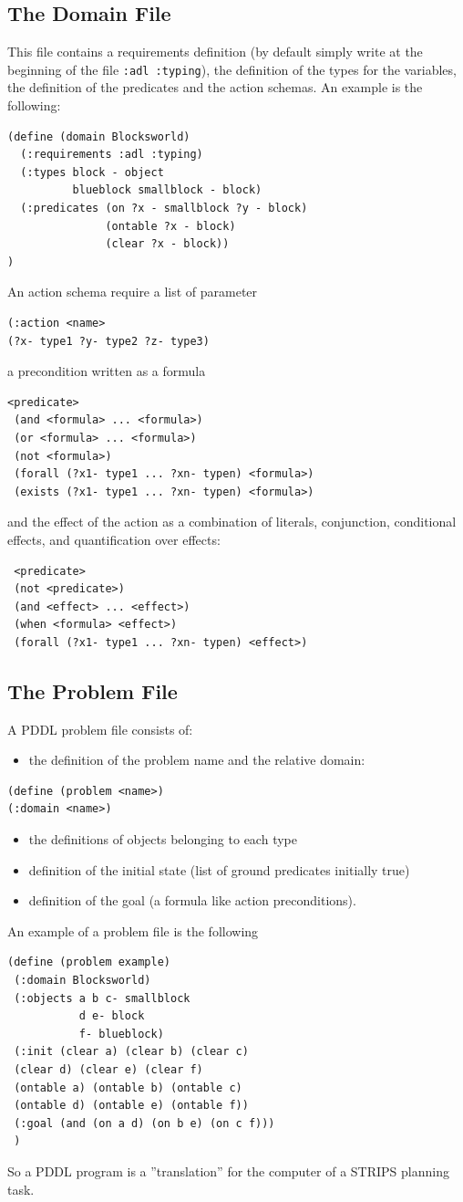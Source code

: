 \documentclass[10pt, letterpaper]{report}
\begin{document}
 \subsection{The Domain File}
 This file contains a requirements definition (by default simply write at the beginning of the file \texttt{:adl :typing}), the definition of the types for the variables, the definition of the predicates and the action schemas. An example is the following:

 \begin{lstlisting}
(define (domain Blocksworld)
  (:requirements :adl :typing)
  (:types block - object
          blueblock smallblock - block)
  (:predicates (on ?x - smallblock ?y - block)
               (ontable ?x - block)
               (clear ?x - block))
)
\end{lstlisting}
An action schema require a list of parameter
 \begin{lstlisting}
(:action <name>
(?x- type1 ?y- type2 ?z- type3)
\end{lstlisting}
a precondition written as a formula 
\begin{lstlisting}
<predicate>
 (and <formula> ... <formula>)
 (or <formula> ... <formula>)
 (not <formula>)
 (forall (?x1- type1 ... ?xn- typen) <formula>)
 (exists (?x1- type1 ... ?xn- typen) <formula>)
\end{lstlisting}
and the effect of the action as a combination of literals,  conjunction, conditional
 effects, and quantification over effects:
 \begin{lstlisting}
 <predicate>
 (not <predicate>)
 (and <effect> ... <effect>)
 (when <formula> <effect>)
 (forall (?x1- type1 ... ?xn- typen) <effect>)
 \end{lstlisting}
 \subsection{The Problem File}
 A PDDL problem file consists of:\begin{itemize}
    \item the definition of the problem name and the relative domain:
 \end{itemize}
  \begin{lstlisting}
(define (problem <name>)
(:domain <name>)
 \end{lstlisting}\begin{itemize}
    \item the definitions of objects belonging to each type 
    \item definition of the initial state (list of ground predicates initially true)
    \item  definition of the goal (a formula like action preconditions).
 \end{itemize}
 An example of a problem file is the following\begin{lstlisting}
(define (problem example)
 (:domain Blocksworld)
 (:objects a b c- smallblock
           d e- block
           f- blueblock)
 (:init (clear a) (clear b) (clear c)
 (clear d) (clear e) (clear f)
 (ontable a) (ontable b) (ontable c)
 (ontable d) (ontable e) (ontable f))
 (:goal (and (on a d) (on b e) (on c f)))
 )
 \end{lstlisting}
 So a PDDL program is a ''translation'' for the computer of a STRIPS planning task.
\end{document}
